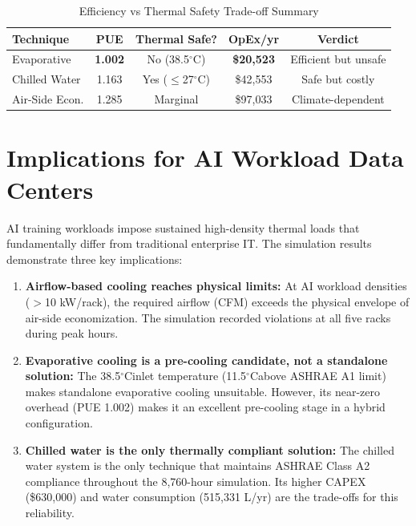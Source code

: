 \documentclass[12pt,a4paper]{report}
\newcommand{\degC}{$^{\circ}$C}
\begin{document}
\begin{table}[H]
\centering
\caption{Efficiency vs Thermal Safety Trade-off Summary}
\label{tab:tradeoff}
\renewcommand{\arraystretch}{1.4}
\begin{tabular}{lcccc}
\toprule
\textbf{Technique} & \textbf{PUE} & \textbf{Thermal Safe?} & \textbf{OpEx/yr} & \textbf{Verdict} \\
\midrule
Evaporative & \textbf{1.002} & \textcolor{failred}{No (38.5\degC)} & \textbf{\$20{,}523} & Efficient but unsafe \\
Chilled Water & 1.163 & \textcolor{passgreen}{Yes ($\leq$27\degC)} & \$42{,}553 & Safe but costly \\
Air-Side Econ. & 1.285 & \textcolor{warnorng}{Marginal} & \$97{,}033 & Climate-dependent \\
\bottomrule
\end{tabular}
\end{table}

\section{Implications for AI Workload Data Centers}

AI training workloads impose sustained high-density thermal loads that fundamentally differ
from traditional enterprise IT. The simulation results demonstrate three key implications:

\begin{enumerate}
  \item \textbf{Airflow-based cooling reaches physical limits:} At AI workload densities
  ($>$10 kW/rack), the required airflow (CFM) exceeds the physical envelope of air-side
  economization. The simulation recorded violations at all five racks during peak hours.
  
  \item \textbf{Evaporative cooling is a pre-cooling candidate, not a standalone solution:}
  The 38.5\degC inlet temperature (11.5\degC above ASHRAE A1 limit) makes standalone
  evaporative cooling unsuitable. However, its near-zero overhead (PUE 1.002) makes it
  an excellent pre-cooling stage in a hybrid configuration.
  
  \item \textbf{Chilled water is the only thermally compliant solution:} The chilled water
  system is the only technique that maintains ASHRAE Class A2 compliance throughout the
  8{,}760-hour simulation. Its higher CAPEX (\$630{,}000) and water consumption (515{,}331 L/yr)
  are the trade-offs for this reliability.
\end{enumerate}
\end{document}
